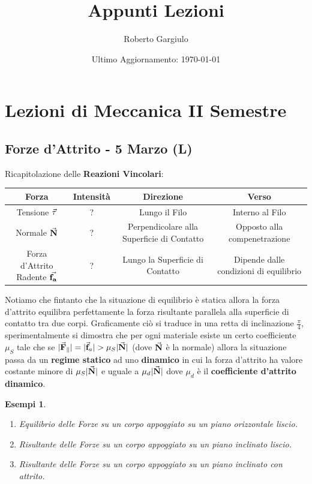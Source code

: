 \documentclass{article}
\title{Appunti Lezioni}
\author{Roberto Gargiulo}
\date{Ultimo Aggiornamento: \today}
\newtheorem{example}{Esempi}[subsection]
\newcommand{\N}{\va{N}}
\newcommand{\F}{\va{F}}
\newcommand{\f}{\va{f}}
\begin{document}
\maketitle
\tableofcontents
\pagebreak

\section{Lezioni di Meccanica II Semestre}

\subsection{Forze d'Attrito - 5 Marzo (L)}

Ricapitolazione delle \textbf{Reazioni Vincolari}:
\begin{center}
\begin{tabular}{c|c|c|c}
    Forza & Intensità & Direzione & Verso \\
    \hline
    Tensione $\va{\tau}$ & ? & Lungo il Filo & Interno al Filo\\
    Normale $\va{N}$ & ? & Perpendicolare alla Superficie di Contatto & Opposto alla compenetrazione\\
    Forza d'Attrito Radente $\va{f_a}$ & ? & Lungo la Superficie di Contatto & Dipende dalle condizioni di equilibrio\\
    \hline
\end{tabular}
\end{center}

Notiamo che fintanto che la situazione di equilibrio è statica allora la forza d'attrito equilibra perfettamente la forza risultante parallela alla superficie di contatto tra due corpi. Graficamente ciò si traduce in una retta di inclinazione $\frac{\pi}{4}$, sperimentalmente si dimostra che per ogni materiale esiste un certo coefficiente $\mu_S$ tale che se $|\F_\parallel|=|\f_a|>\mu_S|\N|$ (dove $\N$ è la normale) allora la situazione passa da un \textbf{regime statico} ad uno \textbf{dinamico} in cui la forza d'attrito ha valore costante minore di $\mu_S|\N|$ e uguale a $\mu_d|\N|$ dove $\mu_d$ è il \textbf{coefficiente d'attrito dinamico}.

\begin{example}
\begin{enumerate}
    \item Equilibrio delle Forze su un corpo appoggiato su un piano orizzontale liscio.
    \item Risultante delle Forze su un corpo appoggiato su un piano inclinato liscio.
    \item Risultante delle Forze su un corpo appoggiato su un piano inclinato con attrito.
\end{enumerate}
\end{example}
\end{document}
